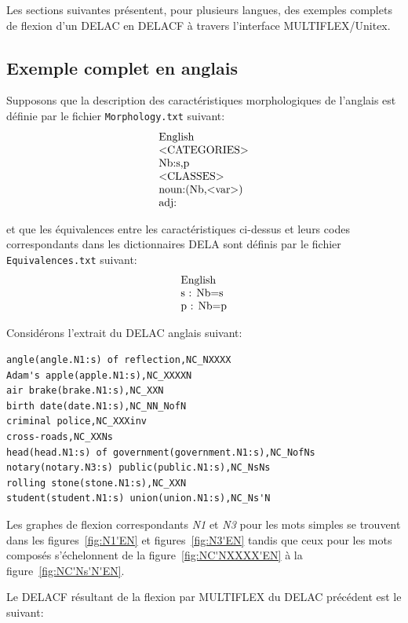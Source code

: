 \bigskip
\noindent Les sections suivantes présentent, pour plusieurs langues, des exemples complets de
flexion d'un DELAC en DELACF à travers l'interface MULTIFLEX/Unitex.

\subsection{Exemple complet en anglais}
Supposons que la description des caractéristiques morphologiques de l'anglais est définie par le
fichier \verb+Morphology.txt+ suivant:
\[
\begin{array}[l]{l}
$English$ \\
$<CATEGORIES>$ \\
$Nb:s,p$ \\
$<CLASSES>$ \\
$noun:(Nb,<var>)$ \\
$adj:$
\end{array}
\]

\bigskip
\noindent et que les équivalences entre les caractéristiques ci-dessus et leurs codes correspondants
dans les dictionnaires DELA sont définis par le fichier \verb+Equivalences.txt+ suivant: 
\[
\begin{array}[l]{l}
$English$ \\
$s : Nb=s$ \\
$p : Nb=p$ \\
\end{array}
\]

\bigskip
\noindent Considérons l'extrait du DELAC anglais suivant:

\begin{verbatim}
angle(angle.N1:s) of reflection,NC_NXXXX
Adam's apple(apple.N1:s),NC_XXXXN
air brake(brake.N1:s),NC_XXN
birth date(date.N1:s),NC_NN_NofN
criminal police,NC_XXXinv
cross-roads,NC_XXNs
head(head.N1:s) of government(government.N1:s),NC_NofNs
notary(notary.N3:s) public(public.N1:s),NC_NsNs
rolling stone(stone.N1:s),NC_XXN
student(student.N1:s) union(union.N1:s),NC_Ns'N
\end{verbatim}

\bigskip
\noindent Les graphes de flexion correspondants \emph{N1} et \emph{N3} pour les mots simples
se trouvent dans les figures~\ref{fig:N1'EN} et figures~\ref{fig:N3'EN} tandis que ceux pour les mots
composés s'échelonnent de la figure~\ref{fig:NC'NXXXX'EN} à la figure~\ref{fig:NC'Ns'N'EN}. 

\bigskip
\noindent Le DELACF résultant de la flexion par MULTIFLEX du DELAC précédent est le suivant:

